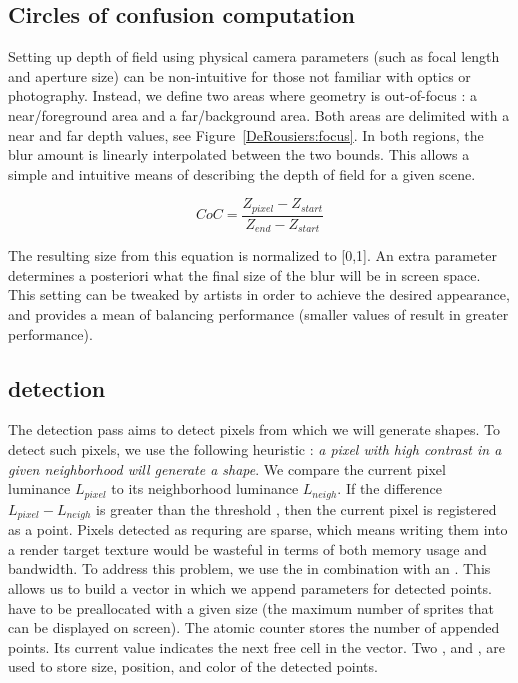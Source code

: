 \subsection{Circles of confusion computation}
Setting up depth of field using physical camera parameters (such as focal length and aperture size) can be non-intuitive for those not familiar with optics or photography. Instead, we define two areas where geometry is out-of-focus : a near/foreground area and a far/background area. Both areas are delimited with a near and far depth values, see Figure~\ref{DeRousiers:focus}. In both regions, the blur amount is linearly interpolated between the two bounds. This allows a simple and intuitive means of describing the depth of field for a given scene.

$$
	CoC = \frac{Z_{pixel} - Z_{start} }{ Z_{end} - Z_{start} }
$$

The resulting \coc size from this equation is normalized to [0,1]. An extra parameter  determines a posteriori what the final size of the blur will be in screen space. This setting can be tweaked by artists in order to achieve the desired appearance, and provides a mean of balancing performance (smaller values of  result in greater performance).


\subsection{\Bokeh detection}
The detection pass aims to detect pixels from which we will generate \bokeh shapes. To detect such pixels, we use the following heuristic : \emph{a pixel with high contrast in a given neighborhood will generate a \bokeh shape}. We compare the current pixel luminance $L_{pixel}$ to its neighborhood luminance $L_{neigh}$. If the difference $L_{pixel}-L_{neigh}$ is greater than the threshold , then the current pixel is registered as a \bokeh point. Pixels detected as requring \bokeh are sparse, which means writing them into a render target texture would be wasteful in terms of both memory usage and bandwidth. To address this problem, we use the \opengl {} in combination with an . This allows us to build a vector in which we append parameters for detected \bokeh points.  have to be preallocated with a given size (\ie the maximum number of \bokeh sprites that can be displayed on screen). The atomic counter  stores the number of appended \bokeh points. Its current value indicates the next free cell in the  vector. Two ,  and , are used to store \coc size, position, and color of the detected \bokeh points. 

